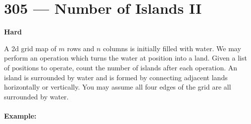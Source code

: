 
\section{305 --- Number of Islands II}

\textbf{Hard}

A 2d grid map of $m$ rows and $n$ columns is initially filled with water. We may perform an  operation which turns the water at position  into a land. Given a list of positions to operate, count the number of islands after each  operation. An island is surrounded by water and is formed by connecting adjacent lands horizontally or vertically. You may assume all four edges of the grid are all surrounded by water.

\paragraph{Example:}

